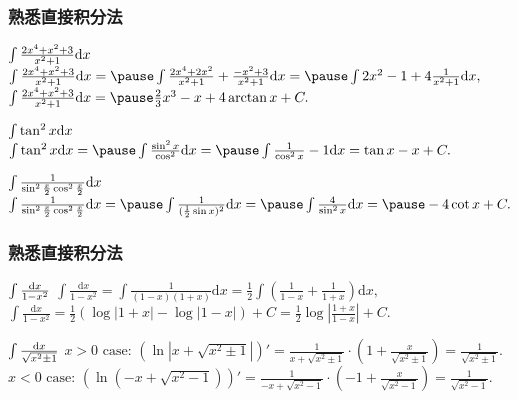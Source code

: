 \documentclass[
10pt,
aspectratio=43,
]{beamer}
\begin{document}
\begin{frame}
	\frametitle{熟悉直接积分法}
	\everymath{\displaystyle}
	{\small
		\begin{exampleblock}{$\color{black}\int \frac{2 x^4+x^2+3}{x^2+1} \mathrm{d} x$}
			$
				\int \frac{2 x^4+x^2+3}{x^2+1} \mathrm{d} x =\pause \int \frac{2 x^4+2x^2}{x^2+1}+\frac{-x^2+3}{x^2+1} \mathrm{d} x =\pause \int 2x^2-1+4 \frac{1}{x^2+1}\mathrm{d} x,
			$
			\pause
			$
				\int \frac{2 x^4+x^2+3}{x^2+1} \mathrm{d} x = \pause\frac{2}{3}x^3-x+4\arctan x+ C.
			$
		\end{exampleblock}
		\pause
		\begin{exampleblock}{$\color{black}\int \tan^2 x \mathrm{d} x$}
			$
				\int \tan^2 x \mathrm{d} x =\pause \int \frac{\sin^2 x}{\cos^2}\mathrm{d} x =\pause \int \frac{1}{\cos^2 x}-1\mathrm{d} x=\tan x-x+C.
			$
		\end{exampleblock}
		\pause
		\begin{exampleblock}{$\color{black}\int \frac{1}{\sin ^2 \frac{x}{2} \cos ^2 \frac{x}{2}} \mathrm{d} x$}
			$
				\int \frac{1}{\sin ^2 \frac{x}{2} \cos ^2 \frac{x}{2}} \mathrm{d} x =\pause \int \frac{1}{(\frac{1}{2}\sin x)^2} \mathrm{d} x =\pause \int \frac{4}{\sin^2 x}\mathrm{d} x=\pause-4\cot x+C.
			$
		\end{exampleblock}
	}
\end{frame}

\begin{frame}
	\frametitle{熟悉直接积分法}
	\everymath{\displaystyle}
	{\small
		\begin{exampleblock}{$\color{black}\int \frac{\mathrm{d} x}{1-x^2}$}
			$
				\int \frac{\mathrm{d} x}{1-x^2}= \int \frac{1}{(1-x)(1+x)}\mathrm{d} x=\frac{1}{2}\int \left(\frac{1}{1-x}+\frac{1}{1+x}\right)\mathrm{d} x,
			$
			\\
			$
				\int \frac{\mathrm{d} x}{1-x^2}=\frac{1}{2}(\log|1+x|-\log|1-x|)+C=\frac{1}{2}\log\left|\frac{1+x}{1-x}\right|+C.
			$
		\end{exampleblock}
		\pause
		\begin{alertblock}{$\color{black}\int \frac{\mathrm{d} x}{\sqrt{x^2 \pm 1}}$}
			$
				x>0\,\,\text{case:}\,\, \left(\ln|x+\sqrt{x^2\pm1}|\right)'=\frac{1}{x+\sqrt{x^2\pm1}}\cdot\left(1+\frac{x}{\sqrt{x^2\pm1}}\right)=\frac{1}{\sqrt{x^2\pm1}}.
			$
			\\\vspace{0.2cm}
			$
				x<0\,\,\text{case:}\,\, \left(\ln(-x+\sqrt{x^2-1})\right)'=\frac{1}{-x+\sqrt{x^2-1}}\cdot\left(-1+\frac{x}{\sqrt{x^2-1}}\right)=\frac{1}{\sqrt{x^2-1}}.
			$
		\end{alertblock}
	}
\end{frame}
\end{document}
